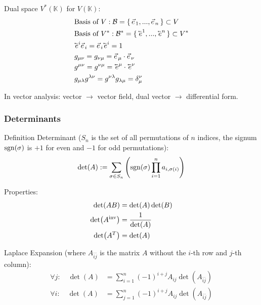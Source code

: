 			\noindent
			Dual space $V^{*}(\mathbb{K})$ for $V(\mathbb{K})$:
			\begin{equation}
				\begin{aligned}
					&\text{Basis of $V$}: \mathcal{B} = \set{ \vec{e}_1,...,\vec{e}_n } \subset V \\
					&\text{Basis of $V^{*}$}: \mathcal{B}^{*} = \set{ \cev{e}^1,...,\cev{e}^n } \subset V^{*} \\
					&\cev{e}^i \vec{e}_i = \vec{e}_i \cev{e}^i = 1 \\
					&g_{\mu\nu} = g_{\nu\mu} = \vec{e}_\mu\cdot\vec{e}_\nu\\
					&g^{\mu\nu} = g^{\nu\mu} = \cev{e}^\mu\cdot\cev{e}^\nu \\
					&g_{\mu\lambda} g^{\lambda\nu} = g^{\nu\lambda}g_{\lambda\mu} = \delta_\mu^\nu \\
				\end{aligned}
			\end{equation}

			In vector analysis: vector $\rightarrow$ vector field, dual vector $\rightarrow$ differential form.

		\subsubsection{Determinants}
			Definition Determinant ($S_n$ is the set of all permutations of $n$ indices, the signum $\mathrm{sgn}(\sigma)$ is $+1$ for even and $-1$ for odd permutations):
			\begin{equation}
				\det(A) := \sum_{\sigma\in S_n}\qty(\mathrm{sgn}(\sigma)\prod_{i=1}^{n} a_{i,\sigma(i)})
			\end{equation}

			\noindent
			Properties:
			\begin{equation}
				\begin{aligned}
					\det(AB) &= \det(A)\det(B) \\
					\det({A}^\mathrm{inv}) &= \frac{1}{\det(A)} \\
					\det(A^T) &= \det(A) \\
				\end{aligned}
			\end{equation}

			\noindent
			Laplace Expansion (where $A_{\bar{i}\bar{j}}$ is the matrix $A$ without the $i$-th row and $j$-th column):
			\begin{equation}
				\begin{aligned}
					\forall j: \quad \det(A) &= \sum_{i=1}^n (-1)^{i+j}A_{ij} \det(A_{\bar{i}\bar{j}}) \\ 
					\forall i: \quad \det(A) &= \sum_{j=1}^n (-1)^{i+j}A_{ij} \det(A_{\bar{i}\bar{j}}) \\
				\end{aligned}
			\end{equation}

